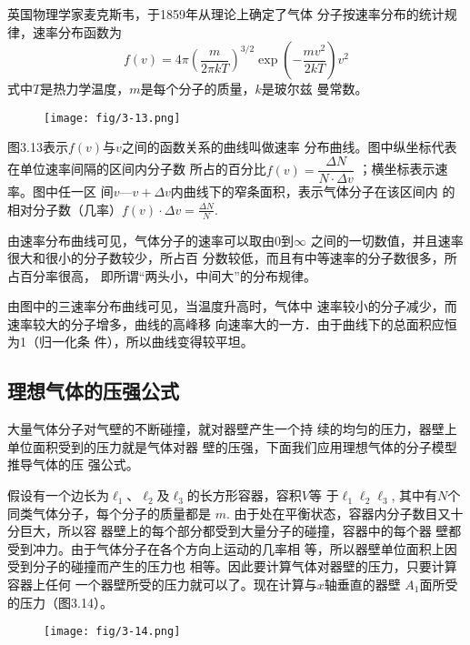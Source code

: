英国物理学家麦克斯韦，于1859年从理论上确定了气体
分子按速率分布的统计规律，速率分布函数为
\[f(v)=4\pi\left(\frac{m}{2\pi kT}\right)^{3/2}\exp\left(-\frac{mv^2}{2kT}\right)v^2\]
式中$T$是热力学温度，$m$是每个分子的质量，$k$是玻尔兹
曼常数。
\begin{figure}[htp]
    \centering
\texttt{[image: fig/3-13.png]}
    \caption{}
\end{figure}


图3.13表示$f(v)$与$v$之间的函数关系的曲线叫做速率
分布曲线。图中纵坐标代表在单位速率间隔的区间内分子数
所占的百分比$f(v)=\dfrac{\Delta N}{N\cdot \Delta v}$
；横坐标表示速率。图中任一区
间$v$—$v+\Delta v$内曲线下的窄条面积，表示气体分子在该区间内
的相对分子数（几率）$f(v)\cdot \Delta v=\frac{\Delta N}{N}$.

由速率分布曲线可见，气体分子的速率可以取由0到$\infty$
之间的一切数值，并且速率很大和很小的分子数较少，所占百
分数较低，而且有中等速率的分子数很多，所占百分率很高，
即所谓“两头小，中间大”的分布规律。

由图中的三速率分布曲线可见，当温度升高时，气体中
速率较小的分子减少，而速率较大的分子增多，曲线的高峰移
向速率大的一方．由于曲线下的总面积应恒为1（归一化条
件），所以曲线变得较平坦。

\subsection{理想气体的压强公式}
大量气体分子对气壁的不断碰撞，就对器壁产生一个持
续的均匀的压力，器壁上单位面积受到的压力就是气体对器
壁的压强，下面我们应用理想气体的分子模型推导气体的压
强公式。

假设有一个边长为$\ell_1$、$\ell_2$及$\ell_3$的长方形容器，容积$V$等
于$\ell_1\ell_2\ell_3$, 其中有$N$个同类气体分子，每个分子的质量都是
$m$. 由于处在平衡状态，容器内分子数目又十分巨大，所以容
器壁上的每个部分都受到大量分子的碰撞，容器中的每个器
壁都受到冲力。由于气体分子在各个方向上运动的几率相
等，所以器壁单位面积上因受到分子的碰撞而产生的压力也
相等。因此要计算气体对器壁的压力，只要计算容器上任何
一个器壁所受的压力就可以了。现在计算与$x$轴垂直的器壁
$A_1$面所受的压力（图3.14）。
\begin{figure}[htp]
    \centering
\texttt{[image: fig/3-14.png]}
    \caption{}
\end{figure}

